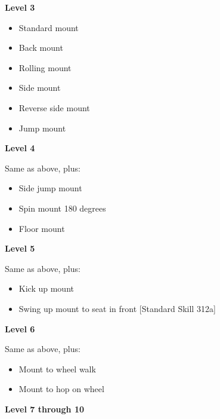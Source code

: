 \begin{multicols}{2}
\textbf{Level 3}
\begin{itemize}
\item Standard mount
\item Back mount
\item Rolling mount
\item Side mount
\item Reverse side mount
\item Jump mount
\end{itemize}

\textbf{Level 4}

Same as above, plus:
\begin{itemize}
\item Side jump mount
\item Spin mount 180 degrees
\item Floor mount
\end{itemize}
\columnbreak

\textbf{Level 5}

Same as above, plus:
\begin{itemize}
\item Kick up mount
\item Swing up mount to seat in front [Standard Skill 312a]
\end{itemize}

\textbf{Level 6}

Same as above, plus:
\begin{itemize}
\item Mount to wheel walk
\item Mount to hop on wheel
\end{itemize}
\end{multicols}

\textbf{Level 7 through 10}

